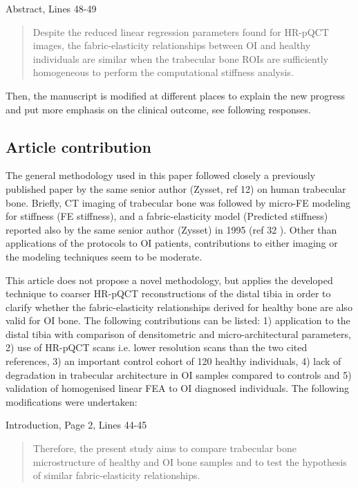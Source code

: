 \documentclass{AR2RC}
\begin{document}
Abstract, Lines 48-49
\begin{quote}
	 Despite the reduced linear regression parameters found for HR-pQCT images, the fabric-elasticity relationships between OI and healthy individuals are similar when the trabecular bone ROIs are sufficiently homogeneous to perform the computational stiffness analysis.  
\end{quote}

Then, the manuscript is modified at different places to explain the new progress and put more emphasis on the clinical outcome, see following responses.

\subsection{Article contribution}

\RC The general methodology used in this paper followed closely a previously published paper by the same senior author (Zysset, ref 12) on human trabecular bone. Briefly, CT imaging of trabecular bone was followed by micro-FE modeling for stiffness (FE stiffness), and a fabric-elasticity model (Predicted stiffness) reported also by the same senior author (Zysset) in 1995 (ref 32 ). Other than applications of the protocols to OI patients, contributions to either imaging or the modeling techniques seem to be moderate.

\AR This article does not propose a novel methodology, but applies the developed technique to coarser HR-pQCT reconstructions of the distal tibia in order to clarify whether the fabric-elasticity relationships derived for healthy bone are also valid for OI bone. The following contributions can be listed:
1) application to the distal tibia with comparison of densitometric and micro-architectural parameters, 2) use of HR-pQCT scans i.e. lower resolution scans than the two cited references, 3) an important control cohort of 120 healthy individuals, 4) lack of degradation in trabecular architecture in OI samples compared to controls and 5) validation of homogenised linear FEA to OI diagnosed individuals. The following modifications were undertaken: \par

Introduction, Page 2, Lines 44-45
\begin{quote}
	Therefore, the present study aims to compare trabecular bone microstructure of healthy and OI bone samples and to test the hypothesis of similar fabric-elasticity relationships.
\end{quote}
\end{document}
